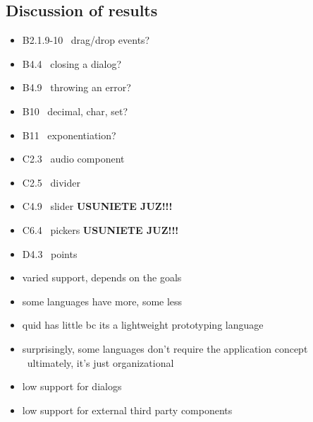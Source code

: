 \subsection{Discussion of results}\label{subsec:evaluation-discussion-of-results}

\begin{itemize}
    \item B2.1.9-10 \textendash\ drag/drop events?
    \item B4.4 \textendash\ closing a dialog?
    \item B4.9 \textendash\ throwing an error?
    \item B10 \textendash\ decimal, char, set?
    \item B11 \textendash\ exponentiation?
    \item C2.3 \textendash\ audio component
    \item C2.5 \textendash\ divider
    \item C4.9 \textendash\ slider \textbf{USUNIETE JUZ!!!}
    \item C6.4 \textendash\ pickers \textbf{USUNIETE JUZ!!!}
    \item D4.3 \textendash\ points
\end{itemize}



\begin{itemize}
    \item varied support, depends on the goals
    \item some languages have more, some less
    \item quid has little bc its a lightweight prototyping language
    \item surprisingly, some languages don't require the application concept \textendash\ ultimately, it's just organizational
    \item low support for dialogs
    \item low support for external third party components
\end{itemize}

